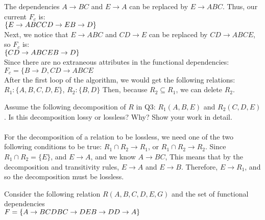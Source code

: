 \documentclass[a4 paper]{article}
\begin{document}
The dependencies $A\rightarrow BC$ and $E\rightarrow A$ can be replaced by $E\rightarrow ABC$. Thus, our current $F_c$ is:\\
$\{
\\E \rightarrow ABC\\
CD \rightarrow E\\
B \rightarrow D\}$\\

Next, we notice that $E \rightarrow ABC$ and $CD \rightarrow E$ can be replaced by $CD\rightarrow ABCE$, so $F_c$ is:\\
$\{
\\CD \rightarrow ABCE\\
B \rightarrow D\}$\\


Since there are no extraneous attributes in the functional dependencies:
$F_c=\{B\rightarrow D, CD\rightarrow ABCE$\\
After the first loop of the algorithm, we would get the following relations:\\
$R_1:\{A,B,C,D,E\}$, $R_2:\{B,D\}$
Then, because $R_2\subseteq R_1$, we can delete $R_2$.


Assume the following decomposition of $R$ in Q3: $R_{1}(A, B, E)$ and $R_{2}(C, D, E)$. Is this decomposition lossy or lossless? Why? Show your work in detail.\\\\
For the decomposition of a relation to be lossless, we need one of the two following conditions to be true: $R_1 \cap R_2\rightarrow R_1$, or $R_1 \cap R_2\rightarrow R_2$.
Since $R_1\cap R_2=\{E\}$, and $E\rightarrow A$, and we know $A\rightarrow BC$, This means that by the decomposition and transitivity rules, $E\rightarrow A$ and $E\rightarrow B$. Therefore, $E\rightarrow R_1$, and so the decomposition must be lossless.



Consider the following relation $R(A, B, C, D, E, G)$ and the set of functional dependencies \\$F = \{
\\A \rightarrow BCD\\
BC \rightarrow DE\\
B \rightarrow D\\
D \rightarrow A\}$\\
\end{document}
